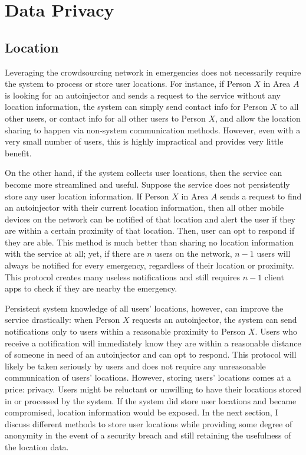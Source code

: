 \section{Data Privacy} \label{sec:data-privacy}

\onehalfspacing

\subsection{Location}

Leveraging the crowdsourcing network in emergencies does not necessarily require the system to process or store user locations. For instance, if Person $X$ in Area $A$ is looking for an autoinjector and sends a request to the service without any location information, the system can simply send contact info for Person $X$ to all other users, or contact info for all other users to Person $X$, and allow the location sharing to happen via non-system communication methods. However, even with a very small number of users, this is highly impractical and provides very little benefit. 

On the other hand, if the system collects user locations, then the service can  become more streamlined and useful. Suppose the service does not persistently store any user location information. If Person $X$ in Area $A$ sends a request to find an autoinjector with their current location information, then all other mobile devices on the network can be notified of that location and alert the user if they are within a certain proximity of that location. Then, user can opt to respond if they are able. This method is much better than sharing no location information with the service at all; yet, if there are $n$ users on the network, $n-1$ users will always be notified for every emergency, regardless of their location or proximity. This protocol creates many useless notifications and still requires $n-1$ client apps to check if they are nearby the emergency.

Persistent system knowledge of all users' locations, however, can improve the service drastically: when Person $X$ requests an autoinjector, the system can send notifications only to users within a reasonable proximity to Person $X$. Users who receive a notification will immediately know they are within a reasonable distance of someone in need of an autoinjector and can opt to respond. This protocol will likely be taken seriously by users and does not require any unreasonable communication of users' locations. However, storing users' locations comes at a price: privacy. Users might be reluctant or unwilling to have their locations stored in or processed by the system. If the system did store user locations and became compromised, location information would be exposed. In the next section, I discuss different methods to store user locations while providing some degree of anonymity in the event of a security breach and still retaining the usefulness of the location data.

